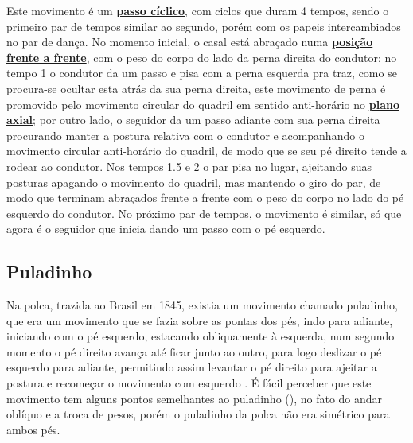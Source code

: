 Este movimento é um \hyperref[def:PassoCiclico]{\textbf{passo cíclico}}, com ciclos que duram 4 tempos, 
sendo o primeiro par de tempos similar ao segundo, porém com os papeis intercambiados no par de dança.
No momento inicial, o casal está abraçado numa \hyperref[def:frente-frente-position]{\textbf{posição frente a frente}}, 
com o peso do corpo do lado da perna direita do condutor;
no tempo 1 o condutor da um passo e pisa com a perna esquerda pra traz, 
como se procura-se ocultar esta atrás da sua perna direita, 
este movimento de perna é promovido pelo movimento circular do 
quadril em sentido anti-horário no \hyperref[def:PlanoAxial]{\textbf{plano axial}};
por outro lado, 
o seguidor da um passo adiante com sua perna direita procurando manter a postura 
relativa com o condutor e acompanhando o movimento circular anti-horário do quadril, 
de modo que se seu pé direito tende a   rodear ao condutor.
Nos tempos 1.5 e 2 o par pisa no lugar, ajeitando suas posturas apagando o movimento do quadril, 
mas mantendo o giro do par, 
de modo que terminam abraçados  frente a frente com o peso do corpo no lado do pé esquerdo do condutor.
No próximo par de tempos, o movimento é similar, só que agora é o seguidor que inicia dando um passo com o pé esquerdo. 

\subsection{Puladinho }

Na polca, trazida ao Brasil em 1845, 
existia um movimento chamado puladinho,
que era um movimento que se fazia sobre as pontas dos pés,
indo para adiante, iniciando com o pé esquerdo, estacando obliquamente à esquerda,
num segundo momento o pé direito avança até ficar junto ao outro, 
para logo deslizar o pé esquerdo para adiante, 
permitindo assim levantar o pé direito para ajeitar a postura 
e recomeçar o movimento com esquerdo \cite[pp. 58-59]{tinhorao1986pequena}.
É fácil perceber que este movimento tem alguns pontos semelhantes ao puladinho (\AnoLivro),
no fato do andar oblíquo e a troca de pesos, porém o puladinho da polca não era simétrico para ambos pés.


